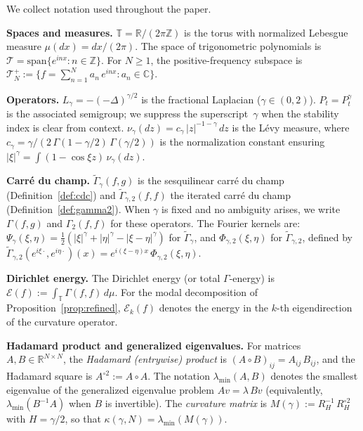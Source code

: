 \documentclass[11pt,a4paper]{article}
\theoremstyle{plain}
\theoremstyle{definition}
\theoremstyle{remark}
\newcommand{\R}{\mathbb{R}}
\newcommand{\Z}{\mathbb{Z}}
\newcommand{\C}{\mathbb{C}}
\newcommand{\T}{\mathbb{T}}
\begin{document}
We collect notation used throughout the paper.

\medskip\noindent\textbf{Spaces and measures.}
$\T = \R/(2\pi\Z)$ is the torus with normalized Lebesgue measure
$\mu(dx) = dx/(2\pi)$.
The space of trigonometric polynomials is
$\mathcal{T} = \mathrm{span}\{e^{inx} : n \in \Z\}$.
For $N \geq 1$, the positive-frequency subspace is
$\mathcal{T}_N^+ := \{f = \sum_{n=1}^N a_n\,e^{inx} : a_n \in \C\}$.

\medskip\noindent\textbf{Operators.}
$L_\gamma = -(-\Delta)^{\gamma/2}$ is the fractional Laplacian
($\gamma \in (0,2)$).
$P_t = P_t^\gamma$ is the associated semigroup; we suppress the
superscript~$\gamma$ when the stability index is clear from context.
$\nu_\gamma(dz) = c_\gamma\,|z|^{-1-\gamma}\,dz$ is the L\'evy measure,
where $c_\gamma = \gamma/(2\,\Gamma(1-\gamma/2)\,\Gamma(\gamma/2))$
is the normalization constant ensuring
$|\xi|^\gamma = \int (1 - \cos \xi z)\,\nu_\gamma(dz)$.

\medskip\noindent\textbf{Carr\'e du champ.}
$\widetilde{\Gamma}_\gamma(f,g)$ is the sesquilinear carr\'e du champ
(Definition~\ref{def:cdc}) and
$\widetilde{\Gamma}_{\gamma,2}(f,f)$ the iterated carr\'e du champ
(Definition~\ref{def:gamma2}).
When $\gamma$ is fixed and no ambiguity arises,
we write $\Gamma(f,g)$ and $\Gamma_2(f,f)$ for these operators.
The Fourier kernels are:
$\Psi_\gamma(\xi,\eta) = \tfrac{1}{2}(|\xi|^\gamma + |\eta|^\gamma
- |\xi-\eta|^\gamma)$ for $\widetilde{\Gamma}_\gamma$,
and $\Phi_{\gamma,2}(\xi,\eta)$ for $\widetilde{\Gamma}_{\gamma,2}$,
defined by
$\widetilde{\Gamma}_{\gamma,2}(e^{i\xi\cdot}, e^{i\eta\cdot})(x)
= e^{i(\xi-\eta)x}\,\Phi_{\gamma,2}(\xi,\eta)$.

\medskip\noindent\textbf{Dirichlet energy.}
The Dirichlet energy (or total $\Gamma$-energy) is
$\mathcal{E}(f) := \int_\T \Gamma(f,f)\,d\mu$.
For the modal decomposition of Proposition~\ref{prop:refined},
$\mathcal{E}_k(f)$ denotes the energy in the $k$-th eigendirection
of the curvature operator.

\medskip\noindent\textbf{Hadamard product and generalized eigenvalues.}
For matrices $A,B \in \R^{N \times N}$, the \emph{Hadamard
(entrywise) product} is $(A \circ B)_{ij} = A_{ij}\,B_{ij}$,
and the Hadamard square is $A^{\circ 2} := A \circ A$.
The notation $\lambda_{\min}(A,B)$ denotes the smallest eigenvalue
of the generalized eigenvalue problem $Av = \lambda\,Bv$
(equivalently, $\lambda_{\min}(B^{-1}A)$ when $B$ is invertible).
The \emph{curvature matrix} is
$M(\gamma) := R_H^{-1}\,R_H^{\circ 2}$ with $H = \gamma/2$,
so that $\kappa(\gamma,N) = \lambda_{\min}(M(\gamma))$.
\end{document}
